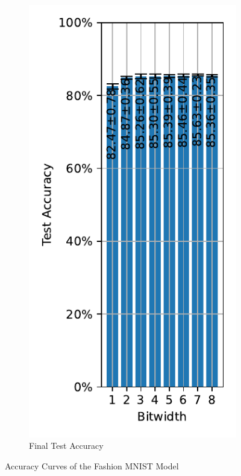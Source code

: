 \begin{figure}[H]
\begin{subfigure}[H]{0.3\textwidth}
                \includegraphics[width=\textwidth]{../standard/FashionMNIST/plots/fashionmnist_final_acc.pdf}
                \caption{Final Test Accuracy}
            \end{subfigure}
            \caption{Accuracy Curves of the Fashion MNIST Model}
        \end{figure}

